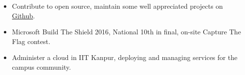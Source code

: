 \vspace{-0.3cm}

{\fontsize{11pt}{1em}\bodyfontlight\upshape\color{text}
\begin{itemize}
  \itemsep-0.3em
  \item Contribute to open source, maintain some well appreciated
    projects on \href{https://github.com/sakshamsharma}{Github}.
  \item Microsoft Build The Shield 2016, National 10th in final,
    on-site Capture The Flag contest.
  \item Administer a cloud in IIT Kanpur, deploying and managing services for the campus community.
\end{itemize}
}


